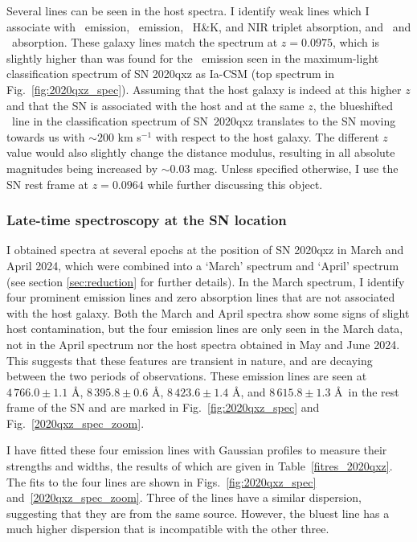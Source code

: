 \documentclass[a4paper,oneside,12pt, class=Latex/Classes/PhDthesisPSnPDF, crop=false]{standalone}
\begin{document}
Several lines can be seen in the host spectra. I identify weak lines which I associate with \Halpha\ emission, \SIIF\ emission, \CaII\ H\&K, and NIR triplet absorption, and \NaID\ and \MgI\ absorption. These galaxy lines match the spectrum at $z=0.0975$, which is slightly higher than was found for the \Halpha\ emission seen in the maximum-light classification spectrum of SN 2020qxz as Ia-CSM (top spectrum in Fig.~\ref{fig:2020qxz_spec}). Assuming that the host galaxy is indeed at this higher $z$ and that the SN is associated with the host and at the same $z$, the blueshifted \Halpha\ line in the classification spectrum of SN~2020qxz translates to the SN moving towards us with $\sim200$ km s$^{-1}$ with respect to the host galaxy. The different $z$ value would also slightly change the distance modulus, resulting in all absolute magnitudes being increased by $\sim0.03$ mag. Unless specified otherwise, I use the SN rest frame at $z=0.0964$ while further discussing this object.


\subsubsection{Late-time spectroscopy at the SN location}
\label{2020qxz_spec}
I obtained spectra at several epochs at the position of SN 2020qxz in March and April 2024, which were combined into a `March' spectrum and `April' spectrum (see section \ref{sec:reduction} for further details). In the March spectrum, I identify four prominent emission lines and zero absorption lines that are not associated with the host galaxy. Both the March and April spectra show some signs of slight host contamination, but the four emission lines are only seen in the March data, not in the April spectrum nor the host spectra obtained in May and June 2024. This suggests that these features are transient in nature, and are decaying between the two periods of observations. These emission lines are seen at $4\,766.0\pm1.1$ \AA, $8\,395.8\pm0.6$ \AA, $8\,423.6\pm1.4$ \AA, and $8\,615.8\pm1.3$ \AA\ in the rest frame of the SN and are marked in Fig.~\ref{fig:2020qxz_spec} and Fig.~\ref{2020qxz_spec_zoom}.

I have fitted these four emission lines with Gaussian profiles to measure their strengths and widths, the results of which are given in Table~\ref{fitres_2020qxz}. The fits to the four lines are shown in Figs.~\ref{fig:2020qxz_spec} and~\ref{2020qxz_spec_zoom}. Three of the lines have a similar dispersion, suggesting that they are from the same source. However, the bluest line has a much higher dispersion that is incompatible with the other three.
\end{document}
